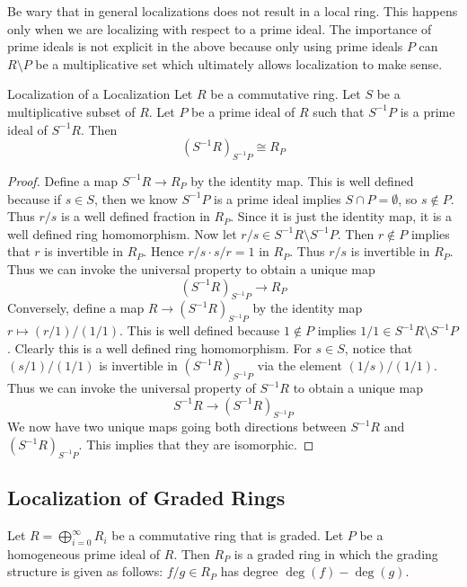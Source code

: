 \documentclass[a4paper]{article}
\begin{document}
Be wary that in general localizations does not result in a local ring. This happens only when we are localizing with respect to a prime ideal. The importance of prime ideals is not explicit in the above because only using prime ideals $P$ can $R\setminus P$ be a multiplicative set which ultimately allows localization to make sense. 

\begin{prp}{Localization of a Localization}{} Let $R$ be a commutative ring. Let $S$ be a multiplicative subset of $R$. Let $P$ be a prime ideal of $R$ such that $S^{-1}P$ is a prime ideal of $S^{-1}R$. Then $$(S^{-1}R)_{S^{-1}P}\cong R_P$$ \tcbline
\begin{proof}
Define a map $S^{-1}R\to R_P$ by the identity map. This is well defined because if $s\in S$, then we know $S^{-1}P$ is a prime ideal implies $S\cap P=\emptyset$, so $s\notin P$. Thus $r/s$ is a well defined fraction in $R_P$. Since it is just the identity map, it is a well defined ring homomorphism. Now let $r/s\in S^{-1}R\setminus S^{-1}P$. Then $r\notin P$ implies that $r$ is invertible in $R_P$. Hence $r/s\cdot s/r=1$ in $R_P$. Thus $r/s$ is invertible in $R_P$. Thus we can invoke the universal property to obtain a unique map $$(S^{-1}R)_{S^{-1}P}\to R_P$$ Conversely, define a map $R\to (S^{-1}R)_{S^{-1}P}$ by the identity map $r\mapsto (r/1)/(1/1)$. This is well defined because $1\notin P$ implies $1/1\in S^{-1}R\setminus S^{-1}P$. Clearly this is a well defined ring homomorphism. For $s\in S$, notice that $(s/1)/(1/1)$ is invertible in $(S^{-1}R)_{S^{-1}P}$ via the element $(1/s)/(1/1)$. Thus we can invoke the universal property of $S^{-1}R$ to obtain a unique map $$S^{-1}R\to(S^{-1}R)_{S^{-1}P}$$ We now have two unique maps going both directions between $S^{-1}R$ and $(S^{-1}R)_{S^{-1}P}$. This implies that they are isomorphic. 
\end{proof}
\end{prp}

\subsection{Localization of Graded Rings}
\begin{prp}{}{} Let $R=\bigoplus_{i=0}^\infty R_i$ be a commutative ring that is graded. Let $P$ be a homogeneous prime ideal of $R$. Then $R_P$ is a graded ring in which the grading structure is given as follows: $f/g\in R_P$ has degree $\deg(f)-\deg(g)$. 
\end{prp}
\end{document}
